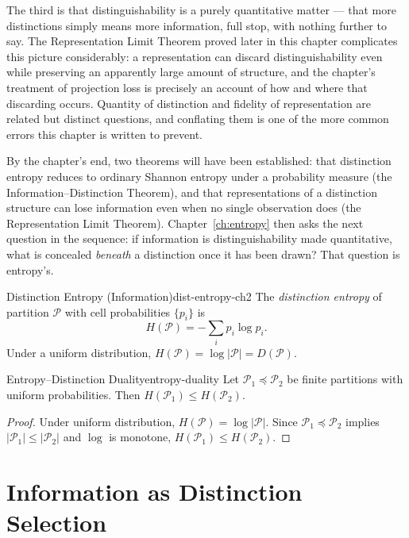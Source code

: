 \documentclass[12pt,twoside,openright]{book}
\newcommand{\partition}{\mathcal{P}}
\begin{document}
The third is that distinguishability is a purely quantitative
matter --- that more distinctions simply means more
information, full stop, with nothing further to say. The
Representation Limit Theorem proved later in this chapter
complicates this picture considerably: a representation can
discard distinguishability even while preserving an apparently
large amount of structure, and the chapter's treatment of
projection loss is precisely an account of how and where that
discarding occurs. Quantity of distinction and fidelity of
representation are related but distinct questions, and
conflating them is one of the more common errors this chapter
is written to prevent.

By the chapter's end, two theorems will have been established:
that distinction entropy reduces to ordinary Shannon entropy
under a probability measure (the Information--Distinction
Theorem), and that representations of a distinction structure
can lose information even when no single observation does (the
Representation Limit Theorem). Chapter~\ref{ch:entropy} then
asks the next question in the sequence: if information is
distinguishability made quantitative, what is concealed
\emph{beneath} a distinction once it has been drawn? That
question is entropy's.

\begin{definition}{Distinction Entropy (Information)}{dist-entropy-ch2}
  The \emph{distinction entropy} of partition $\partition$
  with cell probabilities $\{p_i\}$ is
  \[
    H(\partition) = -\sum_i p_i \log p_i.
  \]
  Under a uniform distribution,
  $H(\partition) = \log|\partition| = D(\partition)$.
\end{definition}

\begin{theorem}{Entropy--Distinction Duality}{entropy-duality}
  Let $\partition_1 \preceq \partition_2$ be finite
  partitions with uniform probabilities. Then
  $H(\partition_1) \le H(\partition_2)$.
\end{theorem}

\begin{proof}
  Under uniform distribution, $H(\partition) = \log|\partition|$.
  Since $\partition_1 \preceq \partition_2$ implies
  $|\partition_1| \le |\partition_2|$ and $\log$ is
  monotone, $H(\partition_1) \le H(\partition_2)$.
\end{proof}

\section{Information as Distinction Selection}
\label{sec:ch2-selection}
\end{document}
